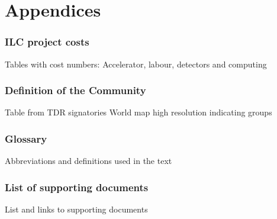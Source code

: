 \documentclass[%
 reprint,
 amsmath,amssymb,
 aps,
]{revtex4-1}
\begin{document}
%


\appendix
\part*{Appendices}

\section{\label{Appendix1}ILC project costs} 
Tables with cost numbers: Accelerator, labour, detectors and computing

\section{\label{Appendix2}Definition of the Community} 

Table from TDR signatories
World map high resolution indicating groups

\section{\label{Appendix3} Glossary} 
Abbreviations and definitions used in the text

\section{\label{Appendix3} List of supporting documents} 
List and links to supporting documents
\end{document}
